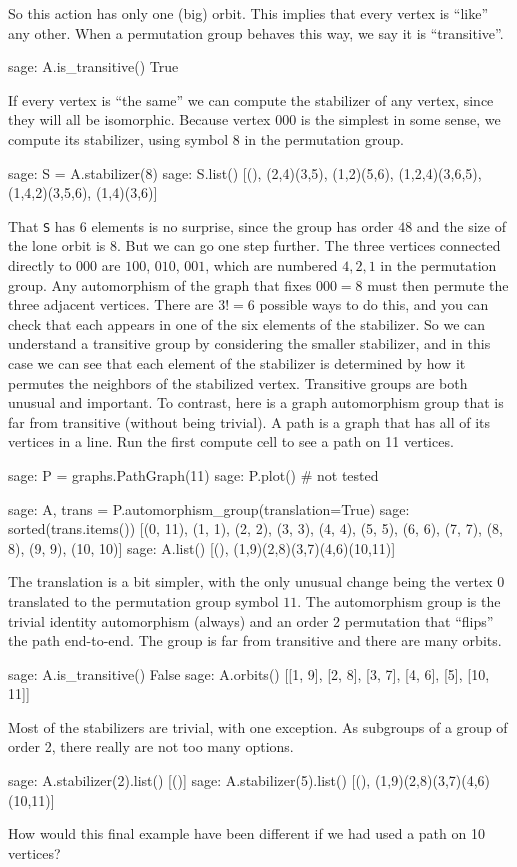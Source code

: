 %
So this action has only one (big) orbit.  This implies that every vertex is ``like'' any other.  When a permutation group behaves this way, we say it is ``transitive''.
%
\begin{sageexample}
sage: A.is_transitive()
True
\end{sageexample}
%
If every vertex is ``the same'' we can compute the stabilizer of any vertex, since they will all be isomorphic.  Because vertex $000$ is the simplest in some sense, we compute its stabilizer, using symbol $8$ in the permutation group.
%
\begin{sageexample}
sage: S = A.stabilizer(8)
sage: S.list()
[(), (2,4)(3,5), (1,2)(5,6), (1,2,4)(3,6,5), (1,4,2)(3,5,6),
 (1,4)(3,6)]
\end{sageexample}
%
That \verb?S? has $6$ elements is no surprise, since the group has order $48$ and the size of the lone orbit is $8$.  But we can go one step further.  The three vertices connected directly to $000$ are $100$, $010$, $001$, which are numbered $4, 2, 1$ in the permutation group.  Any automorphism of the graph that fixes $000 = 8$ must then permute the three adjacent vertices.  There are $3!=6$ possible ways to do this, and you can check that each appears in one of the six elements of the stabilizer.  So we can understand a transitive group by considering the smaller stabilizer, and in this case we can see that each element of the stabilizer is determined by how it permutes the neighbors of the stabilized vertex.
%
Transitive groups are both unusual and important.  To contrast, here is a graph automorphism group that is far from transitive (without being trivial).  A path is a graph that has all of its vertices in a line.  Run the first compute cell to see a path on 11 vertices.
%
%
\begin{sageexample}
sage: P = graphs.PathGraph(11)
sage: P.plot()       # not tested
\end{sageexample}
%
\begin{sageexample}
sage: A, trans = P.automorphism_group(translation=True)
sage: sorted(trans.items())
[(0, 11), (1, 1), (2, 2), (3, 3), (4, 4), (5, 5),
 (6,  6), (7, 7), (8, 8), (9, 9), (10, 10)]
sage: A.list()
[(), (1,9)(2,8)(3,7)(4,6)(10,11)]
\end{sageexample}
%
The translation is a bit simpler, with the only unusual change being the vertex $0$ translated to the permutation group symbol $11$.  The automorphism group is the trivial identity automorphism (always) and an order 2 permutation that ``flips'' the path end-to-end.  The group is far from transitive and there are many orbits.
%
\begin{sageexample}
sage: A.is_transitive()
False
sage: A.orbits()
[[1, 9], [2, 8], [3, 7], [4, 6], [5], [10, 11]]
\end{sageexample}
%
Most of the stabilizers are trivial, with one exception.  As subgroups of a group of order 2, there really are not too many options.
%
\begin{sageexample}
sage: A.stabilizer(2).list()
[()]
sage: A.stabilizer(5).list()
[(), (1,9)(2,8)(3,7)(4,6)(10,11)]
\end{sageexample}
%
How would this final example have been different if we had used a path on 10 vertices?
%